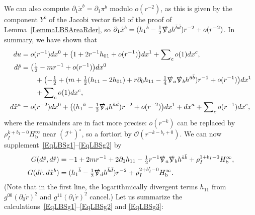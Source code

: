 \documentclass[reqno,11pt,letterpaper]{amsart}
\numberwithin{equation}{section}
\numberwithin{figure}{section}
\theoremstyle{definition}
\theoremstyle{remark}
\newcommand{\mc}{\mathcal}
\newcommand{\cO}{\mc O}
\newcommand{\ms}{\mathscr}
\newcommand{\scri}{\ms I}
\newcommand{\slnabla}{\slashed{\nabla}{}}
\newcommand{\pa}{\partial}
\newcommand{\bop}{{\mathrm{b}}}
\newcommand{\half}{\tfrac{1}{2}}
\newcommand{\Hb}{H_{\bop}}
\begin{document}
We can also compute $\pa_1\mathring x^b=\pa_1\pi^b$ modulo $o(r^{-2})$, as this is given by the component $Y^b$ of the Jacobi vector field of the proof of Lemma~\ref{LemmaLBSAreaRder}, so $\pa_1\mathring x^b=(h_1{}^{\bar b}-\half\slnabla_d h^{\bar b\bar d})r^{-2}+o(r^{-2})$. In summary, we have shown that
\begin{equation}
\label{EqLBSDiff}
\begin{split}
  d u &= o(r^{-1})d x^0 + \bigl(1+2 r^{-1}h_{0 1}+o(r^{-1})\bigr)d x^1 + \sum\nolimits_c o(1)d x^c, \\
  d\mathring r &= \bigl(\half-m r^{-1}+o(r^{-1})\bigr)d x^0 \\
    &\qquad + \bigl(-\half+(m+\half(h_{1 1}-2 h_{0 1})+r\pa_0 h_{1 1}-\tfrac14 \slnabla_a\slnabla_b h^{\bar a\bar b})r^{-1}+o(r^{-1})\bigr)d x^1 \\
    &\qquad + \sum\nolimits_c o(1)d x^c, \\
  d\mathring x^a &= o(r^{-2})d x^0 + \bigl((h_1{}^{\bar a}-\half\slnabla_d h^{\bar a\bar d})r^{-2}+o(r^{-2})\bigr)d x^1 + d x^a + \sum\nolimits_c o(r^{-1})d x^c,
\end{split}
\end{equation}
where the remainders are in fact more precise: $o(r^{-k})$ can be replaced by $\rho_I^{k+b_I-0}\Hb^\infty$ near $(\scri^+)^\circ$, so a fortiori by $\cO(r^{-k-b_I+0})$. We can now supplement~\eqref{EqLBSg1}--\eqref{EqLBSg2} by
\begin{equation}
\label{EqLBSg3}
\begin{split}
  G(d\mathring r,d\mathring r) &= -1 + 2 m r^{-1} + 2\pa_0 h_{1 1} - \half r^{-1}\slnabla_a\slnabla_b h^{\bar a\bar b} + \rho_I^{1+b_I-0}\Hb^\infty, \\
  G(d\mathring r,d\mathring x^b) &= (h_1{}^{\bar b}-\half\slnabla_d h^{\bar b\bar d})r^{-2} + \rho_I^{2+b'_I-0}\Hb^\infty.
\end{split}
\end{equation}
(Note that in the first line, the logarithmically divergent terms $h_{1 1}$ from $g^{0 0}(\pa_0\mathring r)^2$ and $g^{1 1}(\pa_1\mathring r)^2$ cancel.) Let us summarize the calculations~\eqref{EqLBSg1}--\eqref{EqLBSg2} and \eqref{EqLBSg3}:
\end{document}
